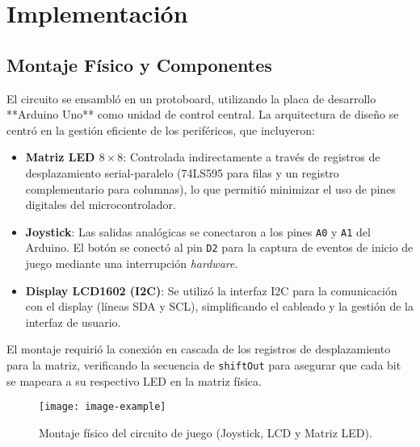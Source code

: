\section{Implementación}

\subsection{Montaje Físico y Componentes}
El circuito se ensambló en un protoboard, utilizando la placa de desarrollo **Arduino Uno** como unidad de control central. La arquitectura de diseño se centró en la gestión eficiente de los periféricos, que incluyeron:

\begin{itemize}
        \item \textbf{Matriz LED $8\times8$}: Controlada indirectamente a través de registros de desplazamiento serial-paralelo (74LS595 para filas y un registro complementario para columnas), lo que permitió minimizar el uso de pines digitales del microcontrolador.
            \item \textbf{Joystick}: Las salidas analógicas se conectaron a los pines \texttt{A0} y \texttt{A1} del Arduino. El botón se conectó al pin \texttt{D2} para la captura de eventos de inicio de juego mediante una interrupción \textit{hardware}.
                \item \textbf{Display LCD1602 (I2C)}: Se utilizó la interfaz I2C para la comunicación con el display (líneas SDA y SCL), simplificando el cableado y la gestión de la interfaz de usuario.
\end{itemize}

El montaje requirió la conexión en cascada de los registros de desplazamiento para la matriz, verificando la secuencia de \texttt{shiftOut} para asegurar que cada bit se mapeara a su respectivo LED en la matriz física.

\begin{figure}[h]
        \centering
            \caption{Montaje físico del circuito de juego (Joystick, LCD y Matriz LED).}
                \label{fig:montaje_fisico}
                    \texttt{[image: image-example]}
\end{figure}

